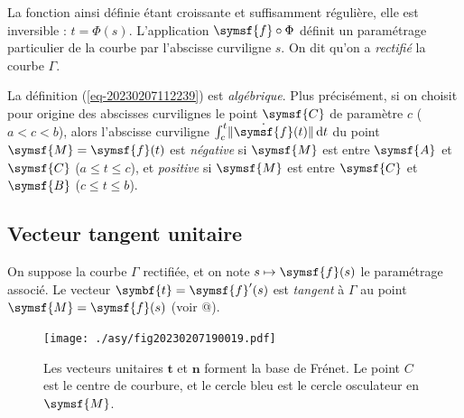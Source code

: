 \documentclass[
  a4paper,
  DIV=11,
  numbers=noendperiod]{scrreprt}
\newcommand{\D}{{\mathrm d}}
\newcommand{\point}[1]{\symsf{#1}}
\renewcommand{\vec}[1]{\symbf{#1}}
\begin{document}
La fonction ainsi définie étant croissante et suffisamment régulière,
elle est inversible : \(t = \Phi(s)\). L'application
\(\point{f} \circ \Phi\) définit un paramétrage particulier de la courbe
par l'abscisse curviligne \(s\). On dit qu'on a \emph{rectifié} la
courbe \(\Gamma\).

\begin{tcolorbox}[enhanced jigsaw, toptitle=1mm, title=\textcolor{quarto-callout-note-color}{\faInfo}\hspace{0.5em}{Note}, colbacktitle=quarto-callout-note-color!10!white, toprule=.15mm, left=2mm, bottomrule=.15mm, arc=.35mm, breakable, opacityback=0, colframe=quarto-callout-note-color-frame, bottomtitle=1mm, titlerule=0mm, leftrule=.75mm, opacitybacktitle=0.6, coltitle=black, rightrule=.15mm, colback=white]

La définition (\ref{eq-20230207112239}) est \emph{algébrique}. Plus
précisément, si on choisit pour origine des abscisses curvilignes le
point \(\point{C}\) de paramètre \(c\) (\(a < c < b\)), alors l'abscisse
curviligne \(\int_c^t \lVert \dot{\point{f}}(t) \rVert \, \D t\) du
point \(\point{M} = \point{f}(t)\) est \emph{négative} si \(\point{M}\)
est entre \(\point{A}\) et \(\point{C}\) (\(a \leq t \leq c\)), et
\emph{positive} si \(\point{M}\) est entre \(\point{C}\) et
\(\point{B}\) (\(c \leq t \leq b\)).

\end{tcolorbox}

\hypertarget{sec-20230207114551}{%
\subsection{Vecteur tangent unitaire}\label{sec-20230207114551}}

On suppose la courbe \(\Gamma\) rectifiée, et on note
\(s \mapsto \point{f}(s)\) le paramétrage associé. Le vecteur
\(\vec{t} = \point{f}'(s)\) est \emph{tangent} à \(\Gamma\) au point
\(\point{M} = \point{f}(s)\) (voir @).

\begin{figure}

{\centering \texttt{[image: ./asy/fig20230207190019.pdf]}

}

\caption{\label{fig-20230207190019}Les vecteurs unitaires \(\vec t\) et
\(\vec n\) forment la base de Frénet. Le point \(C\) est le centre de
courbure, et le cercle bleu est le cercle osculateur en \(\point{M}\).}

\end{figure}
\end{document}
